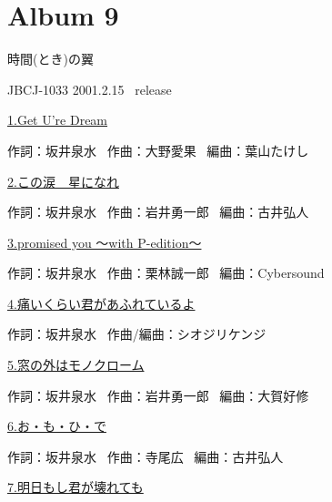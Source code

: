 
\chapter{Album 9}
\thispagestyle{empty} %
\vspace{-16mm}
\LARGE {時間(とき)の翼}

\normalsize{JBCJ-1033 2001.2.15 \ release}
\\

\vspace{-5mm}


\small{\hyperlink{9_0}{1.Get U're Dream}}

\tiny{作詞：坂井泉水 \ 作曲：大野愛果 \ 編曲：葉山たけし}

\small{\hyperlink{9_1}{2.この涙　星になれ}}

\tiny{作詞：坂井泉水 \ 作曲：岩井勇一郎 \ 編曲：古井弘人}

\small{\hyperlink{9_2}{3.promised you ～with P-edition～}}

\tiny{作詞：坂井泉水 \ 作曲：栗林誠一郎 \ 編曲：Cybersound}

\small{\hyperlink{9_3}{4.痛いくらい君があふれているよ}}

\tiny{作詞：坂井泉水 \ 作曲/編曲：シオジリケンジ}

\small{\hyperlink{9_4}{5.窓の外はモノクローム}}

\tiny{作詞：坂井泉水 \ 作曲：岩井勇一郎 \ 編曲：大賀好修}

\small{\hyperlink{9_5}{6.お・も・ひ・で}}

\tiny{作詞：坂井泉水 \ 作曲：寺尾広 \ 編曲：古井弘人}

\small{\hyperlink{9_6}{7.明日もし君が壊れても}}

